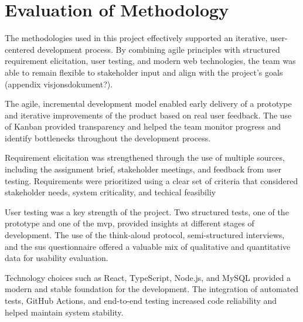 \section{Evaluation of Methodology}
\label{sec:evaluation_of_ethodology}

The methodologies used in this project effectively supported an iterative, user-centered development process. By combining agile principles with structured requirement elicitation, user testing, and modern web technologies, the team was able to remain flexible to stakeholder input and align with the project's goals (appendix visjonsdokument?).

The agile, incremental development model enabled early delivery of a prototype and iterative improvements of the product based on real user feedback. The use of Kanban provided transparency and helped the team monitor progress and identify bottlenecks throughout the development process.

Requirement elicitation was strengthened through the use of multiple sources, including the assignment brief, stakeholder meetings, and feedback from user testing. Requirements were prioritized using a clear set of criteria that considered stakeholder needs, system criticality, and techical feasibiliy

User testing was a key strength of the project. Two structured tests, one of the prototype and one of the \acrshort{mvp}, provided insights at different stages of development. The use of the think-aloud protocol, semi-structured interviews, and the \acrshort{sus} questionnaire offered a valuable mix of qualitative and quantitative data for usability evaluation. 

Technology choices such as React, TypeScript, Node.js, and MySQL provided a modern and stable foundation for the development. The integration of automated tests, GitHub Actions, and end-to-end testing increased code reliability and helped maintain system stability. 